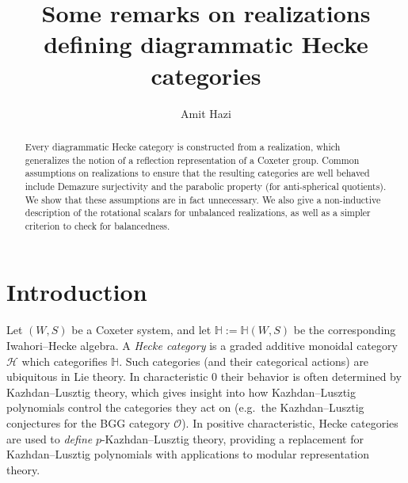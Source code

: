 \documentclass{amsart}
\theoremstyle{plain}
\theoremstyle{definition}
\theoremstyle{remark}
\numberwithin{equation}{section}
\newcommand{\defnemph}[1]{\emph{#1}}
\begin{document}
\title[Remarks on realizations]{Some remarks on realizations defining diagrammatic Hecke categories}
\author{Amit Hazi}


\begin{abstract}
Every diagrammatic Hecke category is constructed from a realization, which generalizes the notion of a reflection representation of a Coxeter group. 
Common assumptions on realizations to ensure that the resulting categories are well behaved include Demazure surjectivity and the parabolic property (for anti-spherical quotients). 
We show that these assumptions are in fact unnecessary. 
We also give a non-inductive description of the rotational scalars for unbalanced realizations, as well as a simpler criterion to check for balancedness. 
\end{abstract}


\maketitle

\section*{Introduction}

Let $(W,S)$ be a Coxeter system, and let $\mathbb{H}:=\mathbb{H}(W,S)$ be the corresponding Iwahori--Hecke algebra. 
A \defnemph{Hecke category} is a graded additive monoidal category $\mathcal{H}$ which categorifies $\mathbb{H}$. 
Such categories (and their categorical actions) are ubiquitous in Lie theory. 
In characteristic $0$ their behavior is often determined by Kazhdan--Lusztig theory, which gives insight into how Kazhdan--Lusztig polynomials control the categories they act on (e.g.~the Kazhdan--Lusztig conjectures for the BGG category $\mathcal{O}$).
In positive characteristic, Hecke categories are used to \emph{define} $p$-Kazhdan--Lusztig theory, providing a replacement for Kazhdan--Lusztig polynomials with applications to modular representation theory. 
\end{document}
